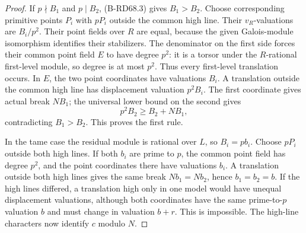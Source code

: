 \begin{proof}
If \(p\nmid B_1\) and \(p\mid B_2\), (B-RD68.3) gives \(B_1>B_2\).
Choose corresponding primitive points \(P_i\) with \(pP_i\)
outside the common high line. Their \(v_R\)-valuations are
\(B_i/p^2\). Their point fields over \(R\) are equal, because
the given Galois-module isomorphism identifies their stabilizers.
The denominator on the first side forces their common point
field \(E\) to have degree \(p^2\): it is a torsor under
the \(R\)-rational first-level module, so degree is at most \(p^2\).
Thus every first-level translation occurs.
In \(E\), the two point coordinates have valuations \(B_i\).
A translation outside the common high line has displacement
valuation \(p^2B_i\). The first coordinate gives actual break
\(NB_1\); the universal lower bound on the second gives
\[
 p^2B_2\ge B_2+NB_1,
 \tag{B-RD68.4}
\]
contradicting \(B_1>B_2\). This proves the first rule.

In the tame case the residual module is rational over \(L\),
so \(B_i=pb_i\). Choose \(pP_i\) outside both high lines.
If both \(b_i\) are prime to \(p\), the common point field has
degree \(p^2\), and the point coordinates there have valuations
\(b_i\). A translation outside both high lines gives the same
break \(Nb_1=Nb_2\), hence \(b_1=b_2=b\).
If the high lines differed, a translation high only in one
model would have unequal displacement valuations, although
both coordinates have the same prime-to-\(p\) valuation \(b\)
and must change in valuation \(b+r\). This is impossible.
The high-line characters now identify \(c\) modulo \(N\).
\end{proof}

